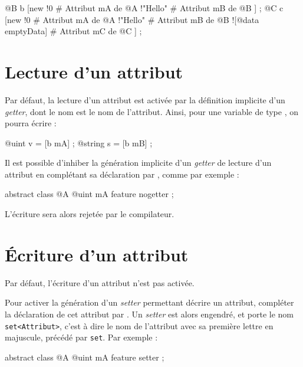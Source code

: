 \begin{galgascode}
@B b [new
  !0 # Attribut mA de @A
  !"Hello" # Attribut mB de @B
] ;
@C c [new
  !0 # Attribut mA de @A
  !"Hello" # Attribut mB de @B
  ![@data emptyData] # Attribut mC de @C
] ;
\end{galgascode}








\section{Lecture d'un attribut}

Par défaut, la lecture d'un attribut est activée par la définition implicite d'un \emph{getter}, dont le nom est le nom de l'attribut. Ainsi, pour une variable  de type , on pourra écrire :

\begin{galgascode}
@uint v = [b mA] ;
@string s = [b mB] ;
\end{galgascode}

Il est possible d'inhiber la génération implicite d'un \emph{getter} de lecture d'un attribut en complétant sa déclaration par , comme par exemple :

\begin{galgascode}
abstract class @A {
  @uint mA feature nogetter ;
}
\end{galgascode}

L'écriture \galgas{[b mA]} sera alors rejetée par le compilateur.









\section{Écriture d'un attribut}

Par défaut, l'écriture d'un attribut n'est pas activée.

Pour activer la génération d'un \emph{setter} permettant décrire un attribut, compléter la déclaration de cet attribut par . Un \emph{setter} est alors engendré, et porte le nom \texttt{set<Attribut>}, c'est à dire le nom de l'attribut avec sa première lettre en majuscule, précédé par \texttt{set}. Par exemple :

\begin{galgascode}
abstract class @A {
  @uint mA feature setter ;
}
\end{galgascode}


